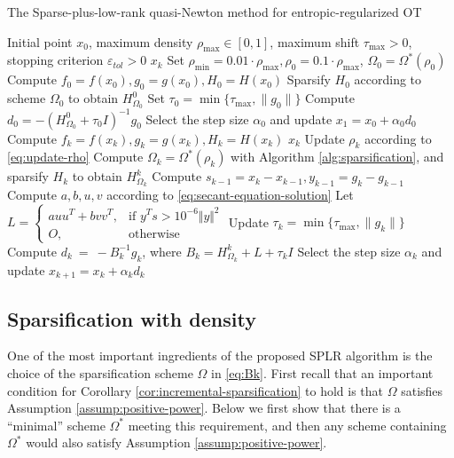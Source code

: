\documentclass{article}
\theoremstyle{plain}
\theoremstyle{definition}
\theoremstyle{remark}
\begin{document}
\begin{algorithm}[h]
   \caption{The Sparse-plus-low-rank quasi-Newton method for entropic-regularized OT}
   \label{alg:SPLR}
\begin{algorithmic}[1]
    \REQUIRE Initial point $x_0$, maximum density $\rho_{\max} \in [0, 1]$, maximum shift $ \tau_{\max} > 0$, stopping criterion $\varepsilon_{tol} > 0$
    \ENSURE $x_k$
    \STATE Set $\rho_{\min} = 0.01\cdot \rho_{\max}, \rho_0 = 0.1\cdot \rho_{\max}$, $\Omega_0 = \Omega^{*}(\rho_0)$
    \STATE Compute $f_0 = f(x_0), g_0 = g(x_0), H_0=H(x_0)$
    \STATE Sparsify $H_0$ according to scheme $\Omega_0$ to obtain $H_{\Omega_0}^{0}$
    \STATE Set $\tau_0=\min\{\tau_{\max}, \|g_0\|\}$
    \STATE Compute $d_0 = -(H_{\Omega_{0}}^{0} + \tau_0 I)^{-1} g_0$
    \STATE Select the step size $\alpha_0$ and update $x_1 = x_0 + \alpha_0 d_0$
        \STATE Compute $f_k = f(x_k), g_k = g(x_k), H_k=H(x_k)$
             $x_k$
        \ENDIF
        \STATE Update $\rho_k$ according to \eqref{eq:update-rho}
        \STATE Compute $\Omega_k = \Omega^{*}(\rho_k)$ with Algorithm \ref{alg:sparsification}, and sparsify $H_k$ to obtain $H_{\Omega_k}^{k}$ 
        \STATE Compute $s_{k-1} = x_k - x_{k-1}, y_{k-1} = g_k - g_{k-1}$
        \STATE Compute $a, b, u, v$ according to \eqref{eq:secant-equation-solution}
        \STATE Let $L=\begin{cases}
            auu^{T}+bvv^{T}, & \text{if }y^{T}s>10^{-6}\Vert y\Vert^{2}\\
            O, & \text{otherwise}
            \end{cases}$
        \STATE Update $\tau_k = \min\{\tau_{\max}, \|g_k\|\}$
        \STATE Compute $d_k ~{=}~ -B_k^{-1} g_k$, where $B_k = H_{\Omega_k}^{k} + L + \tau_k I$
        \STATE Select the step size $\alpha_k$ and update $x_{k+1} = x_k + \alpha_k d_k$
    \ENDFOR
\end{algorithmic}
\end{algorithm}

\subsection{Sparsification with density}
\label{subsec:density}
One of the most important ingredients of the proposed SPLR algorithm is the choice of the sparsification scheme $\Omega$ in \eqref{eq:Bk}.
First recall that an important condition for Corollary \ref{cor:incremental-sparsification} to hold is that $\Omega$ satisfies Assumption \ref{assump:positive-power}. Below we first show that there is a ``minimal'' scheme $\Omega^*$ meeting this requirement, and then any scheme containing $\Omega^*$ would also satisfy Assumption \ref{assump:positive-power}.
\end{document}
